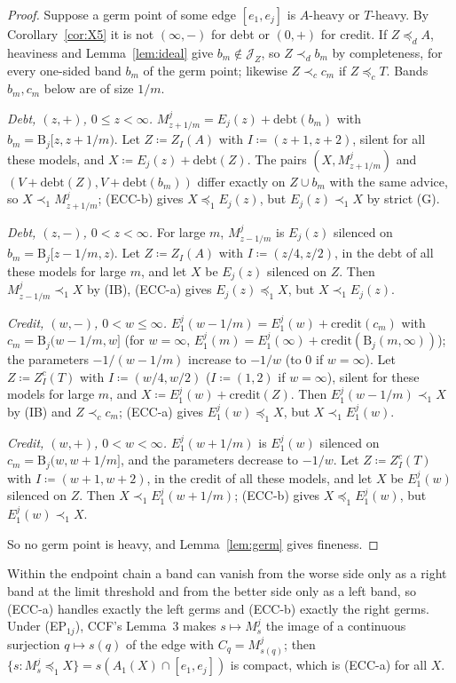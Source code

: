 \documentclass[11pt]{article}
\theoremstyle{definition}\newtheorem{definition}[theorem]{Definition}
\theoremstyle{remark}\newtheorem{remark}[theorem]{Remark}
\newcommand{\debt}{\mathrm{debt}}
\newcommand{\cred}{\mathrm{credit}}
\newcommand{\Band}{\mathrm{B}}
\newcommand{\Jid}{\mathcal J}
\begin{document}
\begin{proof}
Suppose a germ point of some edge $[e_1,e_j]$ is $A$-heavy or $T$-heavy. By
Corollary~\ref{cor:X5} it is not $(\infty,-)$ for debt or $(0,+)$ for credit.
If $Z\preceq_dA$, heaviness and Lemma~\ref{lem:ideal} give $b_m\notin\Jid_Z$,
so $Z\prec_db_m$ by completeness, for every one-sided band $b_m$ of the germ
point; likewise $Z\prec_cc_m$ if $Z\preceq_cT$. Bands $b_m,c_m$ below are of
size $1/m$.

\emph{Debt, $(z,+)$, $0\le z<\infty$.} $M^j_{z+1/m}=E_j(z)+\debt(b_m)$ with
$b_m=\Band_j[z,z+1/m)$. Let $Z\coloneqq Z_I(A)$ with $I\coloneqq(z+1,z+2)$,
silent for all these models, and $X\coloneqq E_j(z)+\debt(Z)$. The pairs
$(X,M^j_{z+1/m})$ and $(V+\debt(Z),V+\debt(b_m))$ differ exactly on
$Z\cup b_m$ with the same advice, so $X\prec_1M^j_{z+1/m}$; (ECC-b) gives
$X\preceq_1E_j(z)$, but $E_j(z)\prec_1X$ by strict (G).

\emph{Debt, $(z,-)$, $0<z<\infty$.} For large $m$,
$M^j_{z-1/m}$ is $E_j(z)$ silenced on $b_m=\Band_j[z-1/m,z)$. Let
$Z\coloneqq Z_I(A)$ with $I\coloneqq(z/4,z/2)$, in the debt of all these
models for large $m$, and let $X$ be $E_j(z)$ silenced on $Z$. Then
$M^j_{z-1/m}\prec_1X$ by (IB), (ECC-a) gives $E_j(z)\preceq_1X$, but
$X\prec_1E_j(z)$.

\emph{Credit, $(w,-)$, $0<w\le\infty$.} $E^j_1(w-1/m)=E^j_1(w)+\cred(c_m)$
with $c_m=\Band_j(w-1/m,w]$ (for $w=\infty$, $E^j_1(m)=E^j_1(\infty)+
\cred(\Band_j(m,\infty))$); the parameters $-1/(w-1/m)$ increase to $-1/w$
(to $0$ if $w=\infty$). Let $Z\coloneqq Z^c_I(T)$ with $I\coloneqq(w/4,w/2)$
($I\coloneqq(1,2)$ if $w=\infty$), silent for these models for large $m$, and
$X\coloneqq E^j_1(w)+\cred(Z)$. Then $E^j_1(w-1/m)\prec_1X$ by (IB) and
$Z\prec_cc_m$; (ECC-a) gives $E^j_1(w)\preceq_1X$, but $X\prec_1E^j_1(w)$.

\emph{Credit, $(w,+)$, $0<w<\infty$.} $E^j_1(w+1/m)$ is $E^j_1(w)$ silenced
on $c_m=\Band_j(w,w+1/m]$, and the parameters decrease to $-1/w$. Let
$Z\coloneqq Z^c_I(T)$ with $I\coloneqq(w+1,w+2)$, in the credit of all these
models, and let $X$ be $E^j_1(w)$ silenced on $Z$. Then
$X\prec_1E^j_1(w+1/m)$; (ECC-b) gives $X\preceq_1E^j_1(w)$, but
$E^j_1(w)\prec_1X$.

So no germ point is heavy, and Lemma~\ref{lem:germ} gives fineness.
\end{proof}

Within the endpoint chain a band can vanish from the worse side only as a
right band at the limit threshold and from the better side only as a left
band, so (ECC-a) handles exactly the left germs and (ECC-b) exactly the right
germs. Under (EP$_{1j}$), CCF's Lemma~3 makes $s\mapsto M^j_s$ the image of a
continuous surjection $q\mapsto s(q)$ of the edge with $C_q=M^j_{s(q)}$; then
$\{s:M^j_s\preceq_1X\}=s(A_1(X)\cap[e_1,e_j])$ is compact, which is (ECC-a)
for all $X$.
\end{document}

